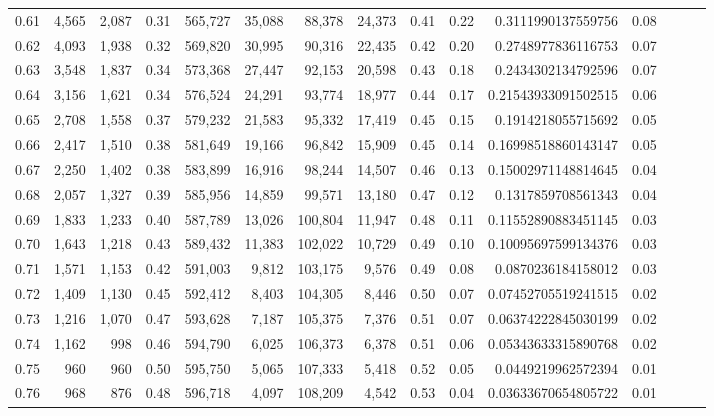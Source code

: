 \begin{tabular}{rrrrrrrrrrrrrrr}
0.61 &   4,565 &  2,087 &  0.31 &  565,727 &   35,088 &   88,378 &   24,373 &  0.41 &  0.22 &      0.3111990137559756 &      0.08 \\
0.62 &   4,093 &  1,938 &  0.32 &  569,820 &   30,995 &   90,316 &   22,435 &  0.42 &  0.20 &      0.2748977836116753 &      0.07 \\
0.63 &   3,548 &  1,837 &  0.34 &  573,368 &   27,447 &   92,153 &   20,598 &  0.43 &  0.18 &      0.2434302134792596 &      0.07 \\
0.64 &   3,156 &  1,621 &  0.34 &  576,524 &   24,291 &   93,774 &   18,977 &  0.44 &  0.17 &     0.21543933091502515 &      0.06 \\
0.65 &   2,708 &  1,558 &  0.37 &  579,232 &   21,583 &   95,332 &   17,419 &  0.45 &  0.15 &      0.1914218055715692 &      0.05 \\
0.66 &   2,417 &  1,510 &  0.38 &  581,649 &   19,166 &   96,842 &   15,909 &  0.45 &  0.14 &     0.16998518860143147 &      0.05 \\
0.67 &   2,250 &  1,402 &  0.38 &  583,899 &   16,916 &   98,244 &   14,507 &  0.46 &  0.13 &     0.15002971148814645 &      0.04 \\
0.68 &   2,057 &  1,327 &  0.39 &  585,956 &   14,859 &   99,571 &   13,180 &  0.47 &  0.12 &      0.1317859708561343 &      0.04 \\
0.69 &   1,833 &  1,233 &  0.40 &  587,789 &   13,026 &  100,804 &   11,947 &  0.48 &  0.11 &     0.11552890883451145 &      0.03 \\
0.70 &   1,643 &  1,218 &  0.43 &  589,432 &   11,383 &  102,022 &   10,729 &  0.49 &  0.10 &     0.10095697599134376 &      0.03 \\
0.71 &   1,571 &  1,153 &  0.42 &  591,003 &    9,812 &  103,175 &    9,576 &  0.49 &  0.08 &      0.0870236184158012 &      0.03 \\
0.72 &   1,409 &  1,130 &  0.45 &  592,412 &    8,403 &  104,305 &    8,446 &  0.50 &  0.07 &     0.07452705519241515 &      0.02 \\
0.73 &   1,216 &  1,070 &  0.47 &  593,628 &    7,187 &  105,375 &    7,376 &  0.51 &  0.07 &     0.06374222845030199 &      0.02 \\
0.74 &   1,162 &    998 &  0.46 &  594,790 &    6,025 &  106,373 &    6,378 &  0.51 &  0.06 &     0.05343633315890768 &      0.02 \\
0.75 &     960 &    960 &  0.50 &  595,750 &    5,065 &  107,333 &    5,418 &  0.52 &  0.05 &      0.0449219962572394 &      0.01 \\
0.76 &     968 &    876 &  0.48 &  596,718 &    4,097 &  108,209 &    4,542 &  0.53 &  0.04 &     0.03633670654805722 &      0.01 \\

\end{tabular}
